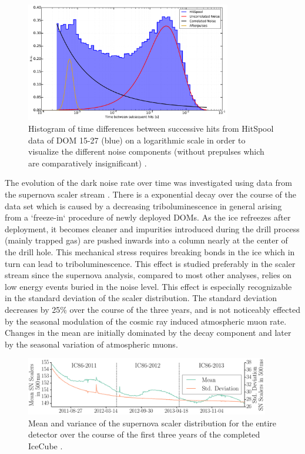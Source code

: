 \begin{figure}[!h]
 \centering
  \includegraphics[width=0.8\textwidth]{graphics/dom/performance/darknoise/SingleDOM_HitSpool_Hits_deltaT_fits_example.pdf}
 \caption{Histogram of time differences between successive hits from HitSpool data of
DOM 15-27 (blue) on a logarithmic scale in order to visualize the different noise components
(without prepulses which are comparatively insignificant) \cite{heereman2015hitspooling}.}
 \label{fig:darknoise_deltaT_components}
\end{figure}


The evolution of the dark noise rate over time was investigated using data from the supernova scaler stream \cite{IC3:supernova, briedel_phd}. There is a exponential decay over the course of the data set which is caused by a decreasing triboluminescence in general arising from a `freeze-in` procedure of newly deployed DOMs. As the ice refreezes after deployment, it becomes cleaner and impurities introduced during the drill process (mainly trapped gas) are pushed inwards into a column nearly at the center of the drill hole. This mechanical stress requires breaking bonds in the ice which in turn can lead to triboluminescence. This effect is studied preferably
in the scaler stream since the supernova analysis, compared to most other analyses, relies on low energy events buried in the noise level.  
This effect is especially recognizable in the standard deviation of the scaler distribution. The standard deviation decreases by 25\% over the course of the three years, and is not noticeably effected by the seasonal modulation of the cosmic ray induced atmospheric muon rate. Changes in the mean are initially dominated by the decay component and later by the seasonal variation of atmospheric muons. 


\begin{figure}[!h]
 \centering
 \includegraphics[width=0.95\textwidth]{graphics/dom/performance/darknoise/briedel1.png}
 \caption{Mean and variance of the supernova scaler distribution for the entire detector over the course of the first three
years of the completed IceCube \cite{briedel_phd}.}
 \label{fig:noise_over_time_briedel}
\end{figure}



